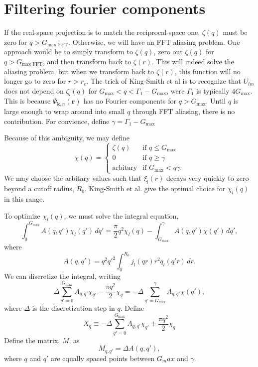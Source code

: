 \documentclass{article}
\newcommand{\vk}{\mathbf{k}}
\newcommand{\vr}{\mathbf{r}}
\begin{document}
\section{Filtering fourier components}
If the real-space projection is to match the reciprocal-space one,
$\zeta(q)$ must be zero for $q > G_\text{max FFT}$.  Otherwise, we
will have an FFT aliasing problem.  One approach would be to simply
transform to $\zeta(q)$, zero out $\zeta(q)$ for $q > G_\text{max
FFT}$, and then transform back to $\zeta(r)$.  This will indeed solve
the aliasing problem, but when we transform back to $\zeta(r)$, this
function will no longer go to zero for $r>r_c$.  The trick of
King-Smith et al\cite{KingSmith} is to recognize that $U_{lm}$ does
not depend on $\zeta_l(q)$ for $G_\text{max} < q <
\Gamma_1-G_\text{max}$, were $\Gamma_1$ is typically $4 G_\text{max}$.
This is because $\Psi_{\vk,n}(\vr)$ has no Fourier components for $q >
G_\text{max}$.  Until $q$ is large enough to wrap around into small
$q$ through FFT aliasing, there is no contribution.  For convience,
define $\gamma = \Gamma_1 - G_\text{max}$

Because of this ambiguity, we may define
\begin{equation}
\chi(q) = 
\begin{cases}
\zeta(q) & \text{if } q \le G_\text{max} \\
0        & \text{if } q \ge \gamma       \\
\text{arbitary} & \text{if } G_\text{max} < q \gamma.
\end{cases}
\end{equation}
We may choose the arbitary values such that $\xi_l(r)$ decays very
quickly to zero beyond a cutoff radius, $R_0$.  King-Smith et al. give
the optimal choice for $\chi_l(q)$ in this range.

To optimize $\chi_l(q)$, we must solve the integral equation,
\begin{equation}
\int_0^{G_\text{max}} A(q,q') \chi_l(q')\, dq' = \frac{\pi}{2} q^2
\chi_l(q) -\int_{G_\text{max}}^\gamma A(q,q')\chi(q')\, dq',
\end{equation}
where
\begin{equation}
A(q,q') = q^2 {q'}^2 \int_0^{R_0} j_l(q r) r^2 q_l(q'r) \, dr.
\end{equation}
We can discretize the integral, writing
\begin{equation}
\Delta \!\! \sum_{q'=0}^{G_\text{max}} A_{q,q'}\chi_{q'} - \frac{\pi
    q^2}{2} \chi_q = -\Delta\!\!\!\!\!\sum_{q'=G_\text{max}}^{\gamma}
    A_{q,q'} \chi(q'),
\end{equation}
where $\Delta$ is the discretization step in $q$.
Define 
\begin{equation}
X_q \equiv -\Delta \sum_{q'=0}^{G_\text{max}} A_{q,q'}\chi_{q'} + \frac{\pi
    q^2}{2} \chi_q
\end{equation}
Define the matrix, $M$, as
\begin{equation}
M_{q,q'} = \Delta A(q,q'),
\end{equation}
where $q$ and $q'$ are equally spaced points between $G_max$ and
$\gamma$.  
\end{document}
